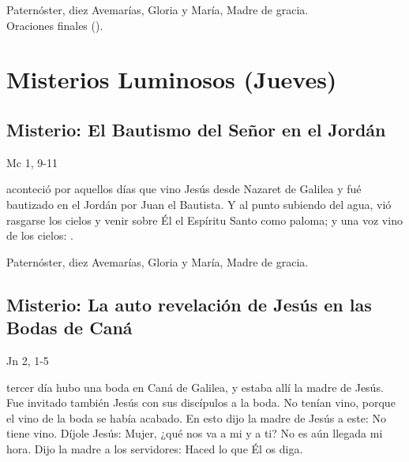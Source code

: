 \documentclass[10pt,a4paper,oneside]{book}
\newcounter{lux-counter}
\begin{document}
\begin{center}
      Paternóster, diez Avemarías, Gloria y María, Madre de gracia.\\
      Oraciones finales ().
\end{center}

\section*{Misterios Luminosos (Jueves)}

\subsection*{ Misterio: El Bautismo del Señor en el Jordán}
\begin{flushright}
      {\color{red}Mc 1, 9-11}
\end{flushright}
 aconteció por aquellos días que vino Jesús desde Nazaret de Galilea y fué bautizado en el Jordán por Juan el Bautista.
Y al punto subiendo del agua, vió rasgarse los cielos y venir sobre Él el Espíritu Santo como paloma; y una voz vino de los cielos:
.

\begin{center}
      Paternóster, diez Avemarías, Gloria y María, Madre de gracia.
\end{center}

\subsection*{ Misterio: La auto revelación de Jesús en las Bodas de Caná}
\begin{flushright}
      {\color{red}Jn 2, 1-5}
\end{flushright}
 tercer día hubo una boda en Caná de Galilea, y estaba allí la madre de Jesús. Fue invitado también Jesús con sus discípulos a la boda.
No tenían vino, porque el vino de la boda se había acabado. En esto dijo la madre de Jesús a este: No tiene vino. Díjole Jesús: Mujer,
¿qué nos va a mi y a ti? No es aún llegada mi hora. Dijo la madre a los servidores: Haced lo que Él os diga.
\end{document}
